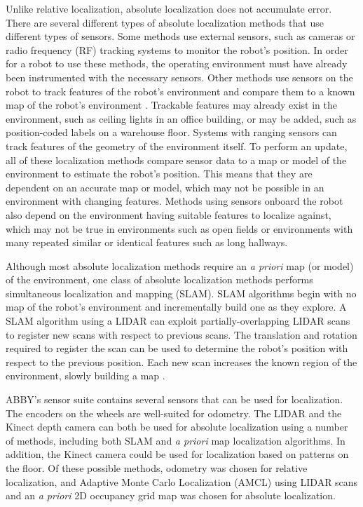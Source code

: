 \documentclass[]{cwru} %
\begin{document}
Unlike relative localization, absolute localization does not accumulate
error. There are several different types of absolute localization
methods that use different types of sensors. Some methods use external
sensors, such as cameras or radio frequency (RF) tracking systems to
monitor the robot's position. In order for a robot to use these methods,
the operating environment must have already been instrumented with the
necessary sensors. Other methods use sensors on the robot to track
features of the robot's environment and compare them to a known map of
the robot's environment \cite{thrun}. Trackable features may already exist in
the environment, such as ceiling lights in an office building, or may be
added, such as position-coded labels on a warehouse floor. Systems with
ranging sensors can track features of the geometry of the environment
itself. To perform an update, all of these localization methods compare
sensor data to a map or model of the environment to estimate the robot's
position. This means that they are dependent on an accurate map or
model, which may not be possible in an environment with changing
features. Methods using sensors onboard the robot also depend on the
environment having suitable features to localize against, which may not
be true in environments such as open fields or environments with many
repeated similar or identical features such as long hallways.

Although most absolute localization methods require an \emph{a priori}
map (or model) of the environment, one class of absolute localization
methods performs simultaneous localization and mapping (SLAM). SLAM
algorithms begin with no map of the robot's environment and
incrementally build one as they explore. A SLAM algorithm using a LIDAR
can exploit partially-overlapping LIDAR scans to register new scans with
respect to previous scans. The translation and rotation required to
register the scan can be used to determine the robot's position with
respect to the previous position. Each new scan increases the known
region of the environment, slowly building a map \cite{thrun}.

ABBY's sensor suite contains several sensors that can be used for
localization. The encoders on the wheels are well-suited for odometry.
The LIDAR and the Kinect depth camera can both be used for absolute
localization using a number of methods, including both SLAM and \emph{a
priori} map localization algorithms. In addition, the Kinect camera
could be used for localization based on patterns on the floor. Of these
possible methods, odometry was chosen for relative localization, and
Adaptive Monte Carlo Localization (AMCL) using LIDAR scans and an
\emph{a priori} 2D occupancy grid map was chosen for absolute
localization.
\end{document}
